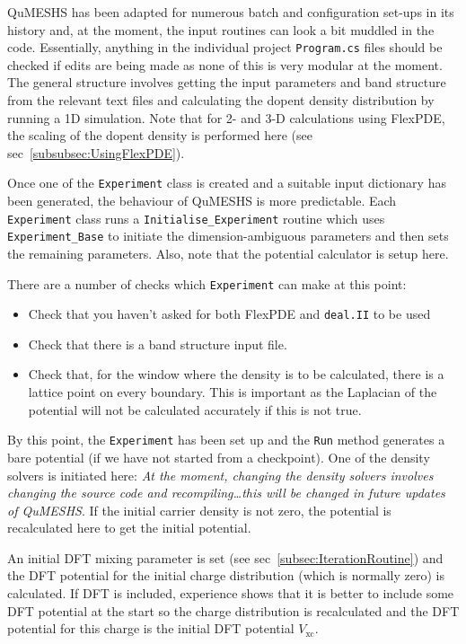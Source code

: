 \documentclass[12pt]{article}
\newcommand{\red}[1]{{\color{red} \it #1}}
\begin{document}
QuMESHS has been adapted for numerous batch and configuration set-ups in its history and,
at the moment, the input routines can look a bit muddled in the code.  Essentially, anything
in the individual project \texttt{Program.cs} files should be checked if edits are being made
as none of this is very modular at the moment.  The general structure involves getting the
input parameters and band structure from the relevant text files and calculating the dopent
density distribution by running a 1D simulation.  Note that for 2- and 3-D calculations using
FlexPDE, the scaling of the dopent density is performed here (see sec~\ref{subsubsec:UsingFlexPDE}).

Once one of the \texttt{Experiment} class is created and a suitable input dictionary has been
generated, the behaviour of QuMESHS is more predictable.  Each \texttt{Experiment} class
runs a \texttt{Initialise\_Experiment} routine which uses \texttt{Experiment\_Base} to initiate
the dimension-ambiguous parameters and then sets the remaining parameters.  Also, note that
the potential calculator is setup here.

There are a number of checks which \texttt{Experiment} can make at this point:
%
\begin{itemize}
    \item Check that you haven't asked for both FlexPDE and \texttt{deal.II} to be used
    \item Check that there is a band structure input file.
    \item Check that, for the window where the density is to be calculated, there is a lattice
    point on every boundary.  This is important as the Laplacian of the potential will not be
    calculated accurately if this is not true.
\end{itemize}

By this point, the \texttt{Experiment} has been set up and the \texttt{Run} method generates
a bare potential (if we have not started from a checkpoint).  One of the density solvers is
initiated here: \red{At the moment, changing the density solvers involves changing the source
code and recompiling\ldots this will be changed in future updates of QuMESHS}.  If the
initial carrier density is not zero, the potential is recalculated here to get the initial
potential.

An initial DFT mixing parameter is set (see sec~\ref{subsec:IterationRoutine}) and the DFT
potential for the initial charge distribution (which is normally zero) is calculated.  If DFT
is included, experience shows that it is better to include some DFT potential at the start so
the charge distribution is recalculated and the DFT potential for this charge is the initial
DFT potential $V_{\mathrm{xc}}$.
\end{document}
